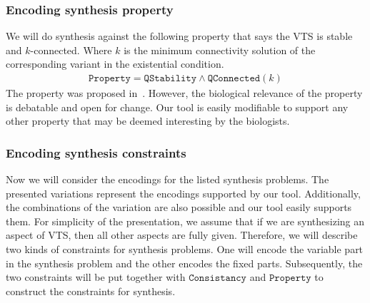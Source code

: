 \subsubsection{Encoding synthesis property}
%
We will do synthesis against the following property that says the VTS
is stable and $k$-connected.
%
Where $k$ is the minimum connectivity solution of the corresponding variant in the existential condition.
%
%
\begin{align*}
\texttt{Property} =  \texttt{QStability} \land \texttt{QConnected}(k) 
\end{align*}
The property was proposed in~\cite{shukla2017discovering}.
%
However, the biological relevance of the property is debatable and open for change.
%
Our tool is easily modifiable to support any other property that may be deemed interesting by the biologists.

\subsubsection{Encoding synthesis constraints}

Now we will consider the encodings for the
listed synthesis problems.
%
The presented variations represent the encodings
supported by our tool.
%
Additionally, the combinations of the variation are also possible and
our tool easily supports them.
%
For simplicity of the presentation, we assume that if we are
synthesizing an aspect of VTS, then all other aspects are fully given.
%
Therefore, we will describe two kinds of constraints for synthesis
problems.
%
One will encode the variable part in the synthesis problem and
the other encodes the fixed parts.
%
Subsequently, the two constraints will be put together with 
$\texttt{Consistancy}$ and 
$\texttt{Property}$ to construct the constraints for synthesis.

